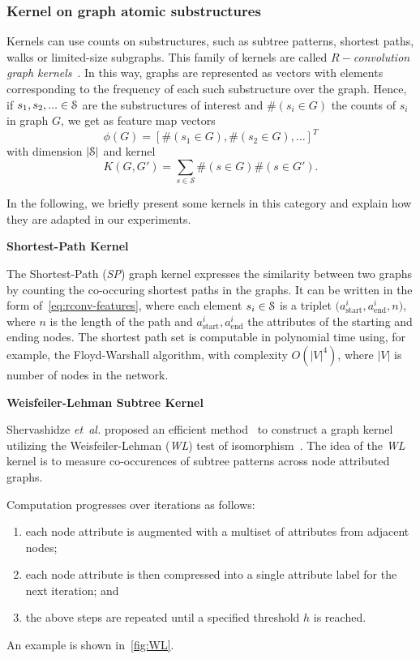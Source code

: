 \subsubsection{Kernel on graph atomic substructures}

Kernels can use counts on substructures, such as subtree patterns, shortest paths, walks or limited-size subgraphs.
This family of kernels are called \emph{$R-$convolution graph kernels}~\cite{haussler}.
In this way, graphs are represented as vectors with elements corresponding to the frequency of each such substructure over the graph.
Hence, if
$ s_1, s_2, ... \in \mathcal{S}$ are the substructures of interest and $ \#\left(s_i \in G\right)$ the counts of $ s_i $ in graph $ G $, we get as feature map vectors
\[ 
\phi(G) = \left[\#\left(s_1 \in G\right), \#\left(s_2 \in G\right), \dots\right]^T
\label{eq:rconv-features}
\]
with dimension $ |\mathcal{S}| $  and kernel
\[
K(G, G') = \sum_{s \in \mathcal{S}} \#\left(s \in G\right) \#\left(s \in G'\right).
\]

In the following, we briefly present some kernels in this category and explain how they are adapted in our experiments.

\vspace{1em}
\noindent\textbf{Shortest-Path Kernel}

The Shortest-Path (\emph{SP}) graph kernel \cite{borgwardt2005} expresses the similarity between two graphs by counting the co-occuring shortest paths in the graphs.
It can be written in the form of~\cref{eq:rconv-features}, where each element $ s_i \in \mathcal{S} $ is a triplet $\big(a_{\text{start}}^i, a_{\text{end}}^i, n\big)$, where $ n $ is the length of the path and $ a_{\text{start}}^i, a_{\text{end}}^i $ the attributes of the starting and ending nodes.
The shortest path set is computable in polynomial time using, for example, the Floyd-Warshall algorithm, with complexity $ O(|V|^4)$, where $ |V| $ is number of nodes in the network.

\vspace{1em}
\noindent\textbf{Weisfeiler-Lehman Subtree Kernel}

Shervashidze \emph{et~al.} proposed an efficient method~\cite{Shervashidze2011} to construct a graph kernel utilizing the \mbox{Weisfeiler-Lehman} (\emph{WL}) test of isomorphism~\cite{weisfeiler1968reduction}.
The idea of the \emph{WL} kernel is to measure co-occurences of subtree patterns across node attributed graphs.

Computation progresses over iterations as follows:
%
\begin{enumerate}
	\item each node attribute is augmented with a multiset of attributes from adjacent nodes;
	\item each node attribute is then compressed into a single attribute label for the next iteration; and
	\item the above steps are repeated until a specified threshold $ h $ is reached.
\end{enumerate}
%
An example is shown in~\cref{fig:WL}.

